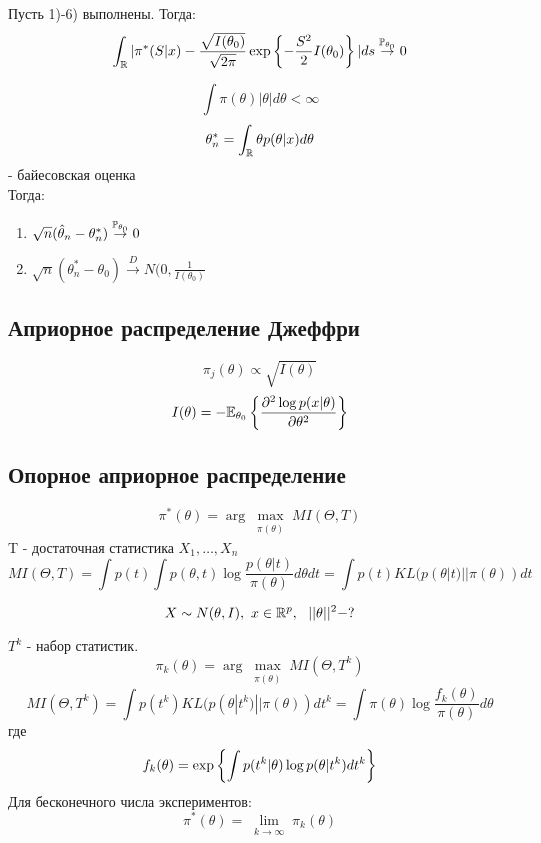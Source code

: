 \begin{theorem}
	Пусть 1)-6) выполнены. Тогда: 
	$$ \int_{\mathbb{R}} |\pi^*(S|x) - \frac{\sqrt{I(\theta_0)}}{\sqrt{2\pi}}\exp\left\{ -\frac{S^2}{2}I(\theta_0) \right\}|ds \overset{\mathbb{P}_{\theta_0}}{\to} 0 $$
\end{theorem}

\begin{theorem}
	$$ \int \pi(\theta)|\theta|  d\theta < \infty $$
	$$ \theta_n^* = \int_{\mathbb{R}} \theta p(\theta|x) d\theta $$ - байесовская оценка \\
	Тогда:
	\begin{enumerate}
		\item $ \sqrt{n} (\hat{\theta}_n - \theta_n^*) \overset{\mathbb{P}_{\theta_0}}{\to} 0 $
		\item $ \sqrt{n}(\theta_n^* - \theta_0) \overset{D}{\to} N(0, \frac{1}{I(\theta_0)}$
	\end{enumerate}
\end{theorem}

\subsection*{Априорное распределение Джеффри}
$$ \pi_j(\theta) \propto \sqrt{I(\theta)} $$
$$ I(\theta) = -\mathbb{E}_{\theta_0} \left\{ \frac{\partial^2 \log p(x|\theta)}{\partial \theta^2} \right\} $$

\subsection*{Опорное априорное распределение}
$$ \pi^*(\theta) = \arg \max_{\substack{\pi(\theta)}} MI(\Theta, T) $$
T - достаточная статистика $X_1, \ldots, X_n$
$$ MI(\Theta, T) = \int p(t) \int p(\theta, t) \log \frac{p(\theta | t)}{\pi(\theta)} d\theta dt = \int p(t) KL(p(\theta|t)|| \pi(\theta)) dt $$

\begin{example}
	$$ X \sim N(\theta, I), \ x \in \mathbb{R}^p, \  \ ||\theta||^2 - ? $$
\end{example}

$T^k$ - набор статистик. $$\pi_k(\theta) = \arg \max_{\substack{\pi(\theta)}} MI(\Theta, T^k)$$
$$ MI(\Theta, T^k) = \int p(t^k) KL(p(\theta|t^k) || \pi(\theta)) dt^k = \int \pi(\theta) \log\frac{f_k(\theta)}{\pi(\theta)}d\theta $$
где $$ f_k(\theta) = \exp \left\{ \int p(t^k|\theta) \log p(\theta|t^k) dt^k \right\} $$
Для бесконечного числа экспериментов:
$$ \pi^*(\theta) = \lim_{\substack{k \to \infty}} \pi_k(\theta) $$

